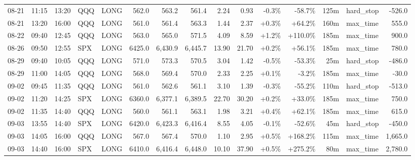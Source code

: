 \documentclass[11pt,a4paper,twoside]{article}
\begin{document}
\begin{landscape}
\begin{center}
\begin{longtable}{>{\color{txtmain}}l l l l l r r r r r r r r >{\color{txtmain}}l r}
08-21 & 11:15 & 13:20 & QQQ & LONG & 562.0 & 563.2 & 561.4 & 2.24 & 0.93 & \textcolor{lossred}{-0.3\%} & \textcolor{lossred}{-58.7\%} & 125m & hard\_stop & \textcolor{lossred}{-526.0} \\
08-21 & 13:20 & 16:00 & QQQ & LONG & 561.0 & 561.4 & 563.3 & 1.44 & 2.37 & \textcolor{wingreen}{+0.3\%} & \textcolor{wingreen}{+64.2\%} & 160m & max\_time & \textcolor{wingreen}{555.0} \\
08-22 & 09:40 & 12:45 & QQQ & LONG & 563.0 & 565.0 & 571.5 & 4.09 & 8.59 & \textcolor{wingreen}{+1.2\%} & \textcolor{wingreen}{+110.0\%} & 185m & max\_time & \textcolor{wingreen}{900.0} \\
08-26 & 09:50 & 12:55 & SPX & LONG & 6425.0 & 6,430.9 & 6,445.7 & 13.90 & 21.70 & \textcolor{wingreen}{+0.2\%} & \textcolor{wingreen}{+56.1\%} & 185m & max\_time & \textcolor{wingreen}{780.0} \\
08-29 & 09:40 & 10:05 & QQQ & LONG & 571.0 & 573.3 & 570.5 & 3.04 & 1.42 & \textcolor{lossred}{-0.5\%} & \textcolor{lossred}{-53.3\%} & 25m & hard\_stop & \textcolor{lossred}{-486.0} \\
08-29 & 11:00 & 14:05 & QQQ & LONG & 568.0 & 569.4 & 570.0 & 2.33 & 2.25 & \textcolor{wingreen}{+0.1\%} & \textcolor{lossred}{-3.2\%} & 185m & max\_time & \textcolor{lossred}{-30.0} \\
09-02 & 09:45 & 11:35 & QQQ & LONG & 561.0 & 562.6 & 561.1 & 3.10 & 1.39 & \textcolor{lossred}{-0.3\%} & \textcolor{lossred}{-55.2\%} & 110m & hard\_stop & \textcolor{lossred}{-513.0} \\
09-02 & 11:20 & 14:25 & SPX & LONG & 6360.0 & 6,377.1 & 6,389.5 & 22.70 & 30.20 & \textcolor{wingreen}{+0.2\%} & \textcolor{wingreen}{+33.0\%} & 185m & max\_time & \textcolor{wingreen}{750.0} \\
09-02 & 11:35 & 14:40 & QQQ & LONG & 560.0 & 561.1 & 563.1 & 1.98 & 3.21 & \textcolor{wingreen}{+0.4\%} & \textcolor{wingreen}{+62.1\%} & 185m & max\_time & \textcolor{wingreen}{615.0} \\
09-03 & 13:55 & 14:40 & SPX & LONG & 6420.0 & 6,423.3 & 6,416.4 & 8.55 & 4.05 & \textcolor{lossred}{-0.1\%} & \textcolor{lossred}{-52.6\%} & 45m & hard\_stop & \textcolor{lossred}{-450.0} \\
09-03 & 14:05 & 16:00 & QQQ & LONG & 567.0 & 567.4 & 570.0 & 1.10 & 2.95 & \textcolor{wingreen}{+0.5\%} & \textcolor{wingreen}{+168.2\%} & 115m & max\_time & \textcolor{wingreen}{1,665.0} \\
09-03 & 14:40 & 16:00 & SPX & LONG & 6410.0 & 6,416.4 & 6,448.0 & 10.10 & 37.90 & \textcolor{wingreen}{+0.5\%} & \textcolor{wingreen}{+275.2\%} & 80m & max\_time & \textcolor{wingreen}{2,780.0} \\

\end{longtable}
\end{center}
\end{landscape}
\end{document}
